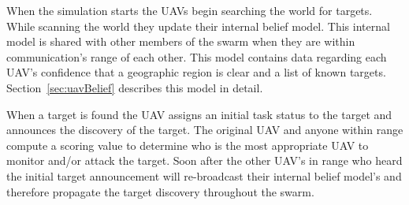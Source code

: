 When the simulation starts the UAVs begin searching the world for targets.  While scanning the world they update their internal belief model.  This internal model is shared with other members of the swarm when they are within communication's range of each other.  This model contains data regarding each UAV's confidence that a geographic region is clear and a list of known targets.  Section~\ref{sec:uavBelief} describes this model in detail.

When a target is found the UAV assigns an initial task status to the target and announces the discovery of the target.  The original UAV and anyone within range compute a scoring value to determine who is the most appropriate UAV to monitor and/or attack the target.  Soon after the other UAV's in range who heard the initial target announcement will re-broadcast their internal belief model's and therefore propagate the target discovery throughout the swarm.
